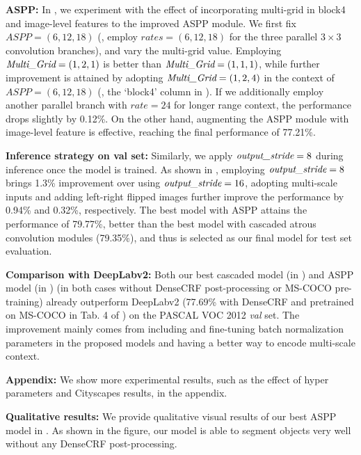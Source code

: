 \textbf{ASPP:} In , we experiment with the effect of incorporating multi-grid in block4 and image-level features to the improved ASPP module. We first fix $ASPP=(6,12,18)$ (\ie, employ $rates=(6,12,18)$ for the three parallel $3\times3$ convolution branches), and vary the multi-grid value. Employing $\emph{Multi\_Grid}=(1,2,1)$ is better than $\emph{Multi\_Grid}=(1,1,1)$, while further improvement is attained by adopting $\emph{Multi\_Grid}=(1,2,4)$ in the context of $ASPP=(6,12,18)$ (\cf, the `block4' column in ). If we additionally employ another parallel branch with $rate = 24$ for longer range context, the performance drops slightly by 0.12\%. On the other hand, augmenting the ASPP module with image-level feature is effective, reaching the final performance of 77.21\%.

\textbf{Inference strategy on val set:} Similarly, we apply $\emph{output\_stride}=8$ during inference once the model is trained. As shown in , employing $\emph{output\_stride}=8$ brings 1.3\% improvement over using $\emph{output\_stride}=16$, adopting multi-scale inputs and adding left-right flipped images further improve the performance by 0.94\% and 0.32\%, respectively. The best model with ASPP attains the performance of 79.77\%, better than the best model with cascaded atrous convolution modules (79.35\%), and thus is selected as our final model for test set evaluation.

\textbf{Comparison with DeepLabv2:} Both our best cascaded model (in ) and ASPP model (in ) (in both cases without DenseCRF post-processing or MS-COCO pre-training) already outperform DeepLabv2 (77.69\% with DenseCRF and pretrained on MS-COCO in Tab. 4 of \cite{chen2016deeplab}) on the PASCAL VOC 2012 \textit{val} set. The improvement mainly comes from including and fine-tuning batch normalization parameters \cite{ioffe2015batch} in the proposed models and having a better way to encode multi-scale context.


\textbf{Appendix:} We show more experimental results, such as the effect of hyper parameters and Cityscapes \cite{Cordts2016Cityscapes} results, in the appendix.

\textbf{Qualitative results:} We provide qualitative visual results of our best ASPP model in . As shown in the figure, our model is able to segment objects very well without any DenseCRF post-processing.

